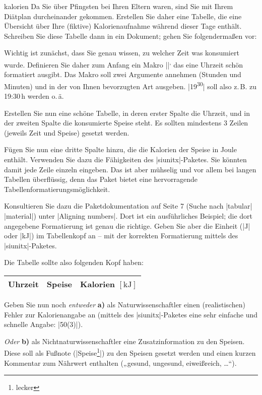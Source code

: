\documentclass[
	solution,
	blatt=6,
	ausgabe=24.\,05.\,2010,
	rückgabe=28.\,05.\,2010
]{lcourse-hd}
\newcommand\zeit[2]{#1\textsuperscript{#2}}
\begin{document}
\begin{exercise}[
  name={Pfingstkalorien},
  punkte=10,
  abgabe = Quellcode per Mail{,} Quellcode und fertiges Dokument (schwarz-weiß) ausgedruckt. Alle Angaben zu den Speisen sind natürlich freiwillig und dürfen fiktiv sein.]{kalorien}
Da Sie über Pfingsten bei Ihren Eltern waren, sind Sie mit Ihrem Diätplan durcheinander gekommen. Erstellen Sie daher eine Tabelle, die eine Übersicht über Ihre (fiktive) Kalorienaufnahme während dieser Tage enthält. Schreiben Sie diese Tabelle dann in ein Dokument; gehen Sie folgendermaßen vor:

Wichtig ist zunächst, dass Sie genau wissen, zu welcher Zeit was konsumiert wurde. Definieren Sie daher zum Anfang ein Makro |\zeit|, das eine Uhrzeit schön formatiert ausgibt. Das Makro soll zwei Argumente annehmen (Stunden und Minuten) und in der von Ihnen bevorzugten Art ausgeben. |\zeit{19}{30}| soll also z.\,B. zu 19:30\,h werden o.\,ä.

Erstellen Sie nun eine schöne Tabelle, in deren erster Spalte die Uhrzeit, und in der zweiten Spalte die konsumierte Speise steht. Es sollten mindestens 3 Zeilen (jeweils Zeit und Speise) gesetzt werden.

Fügen Sie nun eine dritte Spalte hinzu, die die Kalorien der Speise in Joule enthält. Verwenden Sie dazu die Fähigkeiten des |siunitx|-Paketes. Sie könnten damit jede Zeile einzeln eingeben. Das ist aber mühselig und vor allem bei langen Tabellen überflüssig, denn das Paket bietet eine hervorragende Tabellenformatierungsmöglichkeit.

Konsultieren Sie dazu die Paketdokumentation auf Seite 7 (Suche nach |tabular| |material|) unter |Aligning numbers|. Dort ist ein ausführliches Beispiel; die dort angegebene Formatierung ist genau die richtige. Geben Sie aber die Einheit (|J| oder |kJ|) im Tabellenkopf an – mit der korrekten Formatierung mittels des |siunitx|-Paketes.

Die Tabelle sollte also folgenden Kopf haben:
\begin{table}[H]
\centering
\begin{tabular}{lll}
\toprule
Uhrzeit & Speise & Kalorien $[\mathrm{kJ}]$\\\midrule
\end{tabular}
\end{table}

Geben Sie nun noch \emph{entweder} \textbf{a)} als Naturwissenschaftler einen (realistischen) Fehler zur Kalorienangabe an (mittels des |siunitx|-Paketes eine sehr einfache und schnelle Angabe: |50(3)|).

\emph{Oder} \textbf{b)} als Nichtnaturwissenschaftler eine Zusatzinformation zu den Speisen. Diese soll als Fußnote (|Speise\footnote{lecker}|) zu den Speisen gesetzt werden und einen kurzen Kommentar zum Nährwert enthalten („gesund, ungesund, eiweißreich, …“).
\end{exercise}
\end{document}
